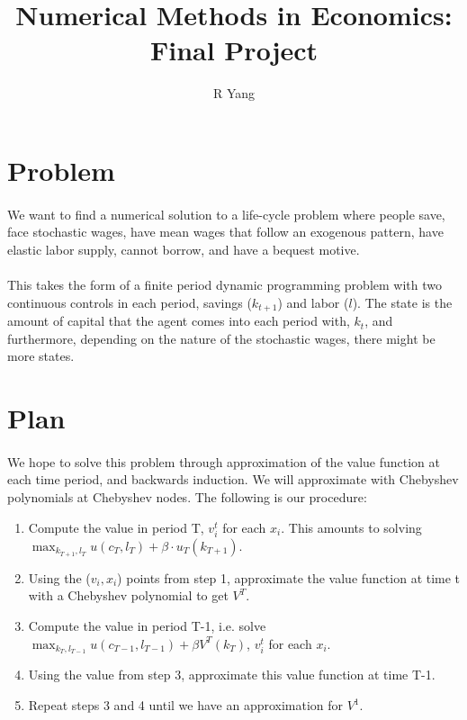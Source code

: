 \documentclass[11pt]{article}
\title{\textbf{Numerical Methods in Economics: Final Project}}
\author{R Yang}
\date{}
\begin{document}
\maketitle

\section{Problem}

\paragraph{} We want to find a numerical solution to a life-cycle problem where people save, face stochastic wages, have mean wages that follow an exogenous pattern, have elastic labor supply, cannot borrow, and have a bequest motive.

\paragraph{} This takes the form of a finite period dynamic programming problem with two continuous controls in each period, savings ($k_{t+1}$) and labor ($l$). The state is the amount of capital that the agent comes into each period with, $k_t$, and furthermore, depending on the nature of the stochastic wages, there might be more states.

\section{Plan}

\paragraph{} We hope to solve this problem through approximation of the value function at each time period, and backwards induction. We will approximate with Chebyshev polynomials at Chebyshev nodes. The following is our procedure:

\begin{enumerate}
	\item Compute the value in period T, $v_i^t$ for each $x_i$. This amounts to solving $\max_{k_{T+1},l_T} u(c_T,l_T) + \beta \cdot u_T(k_{T+1})$.
	\item Using the ($v_i, x_i$) points from step 1, approximate the value function at time t with a Chebyshev polynomial to get $V^T$.
	\item Compute the value in period T-1, i.e. solve $\max_{k_{T},l_{T-1}} u(c_{T-1},l_{T-1}) + \beta V^T(k_{T})$, $v_i^t$ for each $x_i$.
	\item Using the value from step 3, approximate this value function at time T-1.
	\item Repeat steps 3 and 4 until we have an approximation for $V^1$.
\end{enumerate}
\end{document}
